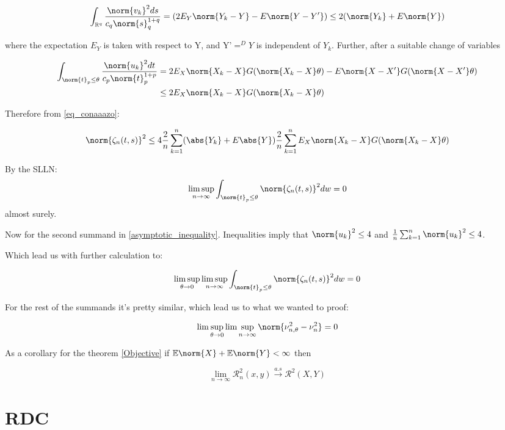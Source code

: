 $$
\int_{\mathbb{R}^{q}}\frac{\norm{v_{k}}^{2}ds}{c_{q}\norm{s}^{1+q}_{q}} = (2E_{Y}\norm{Y_{k}-Y}- E\norm{Y-Y'}) \leq 2(\norm{Y_{k}}+E\norm{Y})
$$

where the expectation $E_{Y}$ is taken with respect to Y, and Y'$=^{D}Y$ is independent of $Y_{k}$. Further, after a suitable change of variables

\begin{equation}{}
\begin{split}
\int_{\norm{t}_{p}\leq\theta} \frac{\norm{u_{k}}^{2}dt}{c_{p}\norm{t}^{1+p}_{p}} &
= 2E_{X}\norm{X_{k}-X}G(\norm{X_{k}-X}\theta) - E\norm{X-X'}G(\norm{X-X'}\theta) \\
&\leq  2E_{X}\norm{X_{k}-X}G(\norm{X_{k}-X}\theta)
\end{split}
\end{equation}

Therefore from \ref{eq_conaaazo}:

$$
\norm{\zeta_{n}(t,s)}^{2} \leq 4\frac{2}{n}\sum_{k=1}^{n}(\abs{Y_{k}}+ E\abs{Y})\frac{2}{n}\sum_{k=1}^{n}E_{X}\norm{X_{k}-X}G(\norm{X_{k}-X}\theta)
$$

By the SLLN:
$$
\limsup_{n\rightarrow\infty}\int_{\norm{t}_{p}\leq\theta}\norm{\zeta_{n}(t,s)}^{2} dw = 0
$$
almost surely.

Now for the second summand in \ref{asymptotic_inequality}. Inequalities \label{eq_conaaazo} imply that $\norm{u_k}^{2} \leq 4$ and $\frac{1}{n}\sum_{k=1}^{n}\norm{u_k}^{2}\leq 4$. 

Which lead us with further calculation to:

$$
\limsup_{\theta\rightarrow0}\limsup_{n\rightarrow\infty}\int_{\norm{t}_{p}\leq\theta}\norm{\zeta_{n}(t,s)}^{2} dw = 0
$$

For the rest of the summands it's pretty similar, which lead us to what we wanted to proof:

$$
\lim\sup_{\theta \to 0} \lim\sup_{n \to \infty} \norm{\nu^{2}_{n,\theta}-\nu^{2}_{n}} = 0
$$


\begin{prop}
As a corollary for the theorem \ref{Objective} 
if $\mathbb{E}\norm{X} + \mathbb{E}\norm{Y} < \infty$ then

$$
\lim_{n\to\infty} \mathcal{R}^{2}_{n}(x,y) \xrightarrow{a.s} \mathcal{R}^{2}(X,Y)
$$
\end{prop}
\newpage
\section{RDC\label{P:RDC}}


